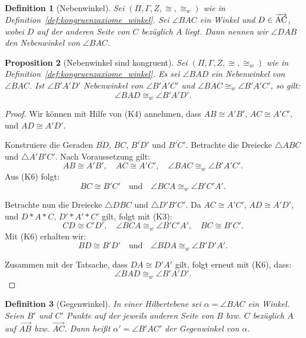 \documentclass[a4paper,12pt]{article}
\theoremstyle{break}
\newtheorem{definition}{Definition}[section]
\newtheorem{proposition}[definition]{Proposition}
\begin{document}
\begin{definition}[Nebenwinkel]
\label{def:nebenwinkel}
Sei \((\Pi, \Gamma, Z, \cong, \cong_w)\) wie in Definition~\ref{def:kongruenzaxiome_winkel}. Sei \(\angle BAC\) ein Winkel und \(D \in \overrightarrow{\rm AC}\), wobei \(D\) auf der anderen Seite von \(C\) bezüglich \(A\) liegt. Dann nennen wir \(\angle DAB\) den \emph{Nebenwinkel} von \(\angle BAC\).
\end{definition}

\begin{proposition}[Nebenwinkel sind kongruent]\label{prop:nebenwinkel_kongruent}
Sei \((\Pi, \Gamma, Z, \cong, \cong_w)\) wie in Definition~\ref{def:kongruenzaxiome_winkel}. Es sei \(\angle BAD\) ein Nebenwinkel von \(\angle BAC\). Ist \(\angle B'A'D'\) Nebenwinkel von \(\angle B'A'C'\) und \(\angle BAC \cong_w \angle B'A'C'\), so gilt:
\[
\angle BAD \cong_w \angle B'A'D'.
\]
\end{proposition}

\begin{proof}
Wir können mit Hilfe von (K4) annehmen, dass \(AB \cong A'B'\), \(AC \cong A'C'\), und \(AD \cong A'D'\). 

Konstruiere die Geraden \(\overline{BD}\), \(\overline{BC}\), \(\overline{B'D'}\) und \(\overline{B'C'}\). Betrachte die Dreiecke \(\triangle ABC\) und \(\triangle A'B'C'\). Nach Voraussetzung gilt:
\[
AB \cong A'B', \quad AC \cong A'C', \quad \angle BAC \cong_w \angle B'A'C'.
\]
Aus (K6) folgt:
\[
BC \cong B'C' \quad \text{und} \quad \angle BCA \cong_w \angle B'C'A'.
\]

Betrachte nun die Dreiecke \(\triangle DBC\) und \(\triangle D'B'C'\). Da \(AC \cong A'C'\), \(AD \cong A'D'\), und \(D * A * C\), \(D' * A' * C'\) gilt, folgt mit (K3):
\[
CD \cong C'D', \quad \angle BCA \cong_w \angle B'C'A', \quad BC \cong B'C'.
\]
Mit (K6) erhalten wir:
\[
BD \cong B'D' \quad \text{und} \quad \angle BDA \cong_w \angle B'D'A'.
\]

Zusammen mit der Tatsache, dass \(DA \cong D'A'\) gilt, folgt erneut mit (K6), dass:
\[
\angle BAD \cong_w \angle B'A'D'.
\]
\end{proof}

\begin{definition}[Gegenwinkel]
\label{def:gegenwinkel}
In einer Hilbertebene sei \(\alpha = \angle BAC\) ein Winkel. Seien \(B'\) und \(C'\) Punkte auf der jeweils anderen Seite von \(B\) bzw. \(C\) bezüglich \(A\) auf \(\overrightarrow{AB}\) bzw. \(\overrightarrow{AC}\). Dann heißt \(\alpha' = \angle B'AC'\) der \emph{Gegenwinkel} von \(\alpha\).
\end{definition}
\end{document}
